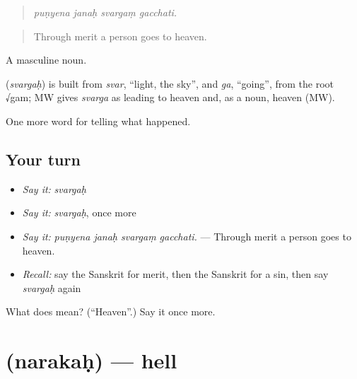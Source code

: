 \begin{quote}
   
\end{quote}

\begin{quote}
\emph{puṇyena janaḥ svargaṃ gacchati.}
\end{quote}

\begin{quote}
Through merit a person goes to heaven.
\end{quote}

A masculine noun.

\begin{cousinweb}
\textbf{} (\emph{svargaḥ}) is built from \emph{svar}, \textquotedblleft{}light, the sky\textquotedblright{}, and \emph{ga}, \textquotedblleft{}going\textquotedblright{}, from the root √gam; MW gives \emph{svarga} as leading to heaven and, as a noun, heaven (MW).
\end{cousinweb}

\begin{grammarlens}[title={What you've built}]
One more word for telling what happened.
\end{grammarlens}

\subsection*{Your turn}
\begin{itemize}
\raggedright
  \item \emph{Say it:} \emph{svargaḥ}
  \item \emph{Say it:} \emph{svargaḥ}, once more
  \item \emph{Say it:} \emph{puṇyena janaḥ svargaṃ gacchati.} — Through merit a person goes to heaven.
  \item \emph{Recall:} say the Sanskrit for merit, then the Sanskrit for a sin, then say \emph{svargaḥ} again
\end{itemize}

\begin{tcolorbox}[breakable,colback=teal!4,colframe=teal!35!black,title={Before you move on}]
What does  mean? (\textquotedblleft{}Heaven\textquotedblright{}.) Say it once more.
\end{tcolorbox}
\section[\texorpdfstring{\sk{नरकः} (narakaḥ)}{नरकः (narakaḥ)}]{ (narakaḥ) — hell}

